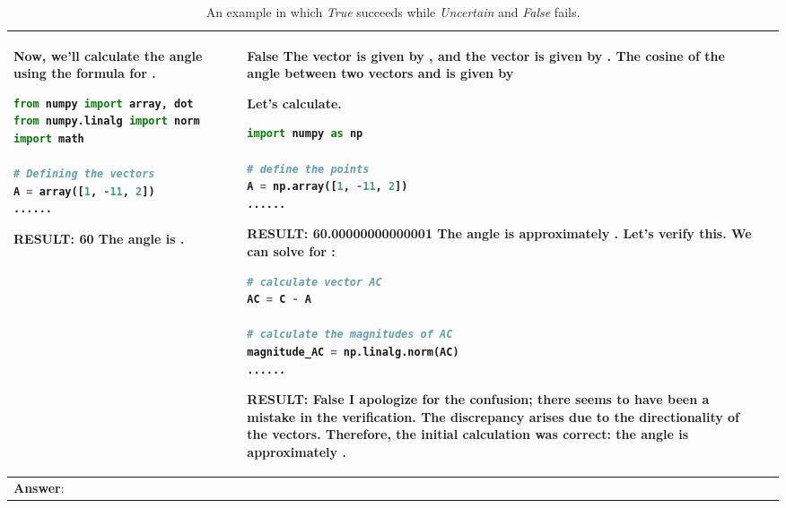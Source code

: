 \documentclass{article} \usepackage{iclr2023_conference,times}
\begin{document}
\begin{table*}[ht]
\begin{tabular}{p{}|p{}|p{}}
Now, we'll calculate the angle using the formula for .
        \lstset{style=mystyle}
     \begin{lstlisting}[language=Python]
from numpy import array, dot
from numpy.linalg import norm
import math

# Defining the vectors
A = array([1, -11, 2])
......
     \end{lstlisting} 
    \textbf{RESULT:}\newline
    \textbf{60}\newline
    The angle  is .
    &
        \small \textbf{False} 
\newline\newline
        The vector  is given by , and the vector  is given by .\newline
        The cosine of the angle between two vectors  and  is given by


Let's calculate.
    \lstset{style=mystyle}
     \begin{lstlisting}[language=Python]
import numpy as np

# define the points
A = np.array([1, -11, 2])
......
     \end{lstlisting} 
    \textbf{RESULT:}\newline
    \textbf{60.00000000000001}\newline
    The angle  is approximately . 
    Let's verify this.
    We can solve for :

    \lstset{style=mystyle}
     \begin{lstlisting}[language=Python]
# calculate vector AC
AC = C - A

# calculate the magnitudes of AC
magnitude_AC = np.linalg.norm(AC)
......
     \end{lstlisting} 
    \textbf{RESULT:}\newline
    \textbf{False}\newline
    I apologize for the confusion; there seems to have been a mistake in the verification.\newline
    The discrepancy arises due to the directionality of the vectors.\newline
    Therefore, the initial calculation was correct: the angle  is approximately .
     \\
     \midrule

      \multicolumn{3}{p{0.90\textwidth}}{\small \textbf{Answer}:  }
\\
     \bottomrule
    \end{tabular}
    \caption{An example in which \textit{True} succeeds while \textit{Uncertain} and \textit{False} fails.}
    \label{tab:verify_example2}
\end{table*}
\end{document}
